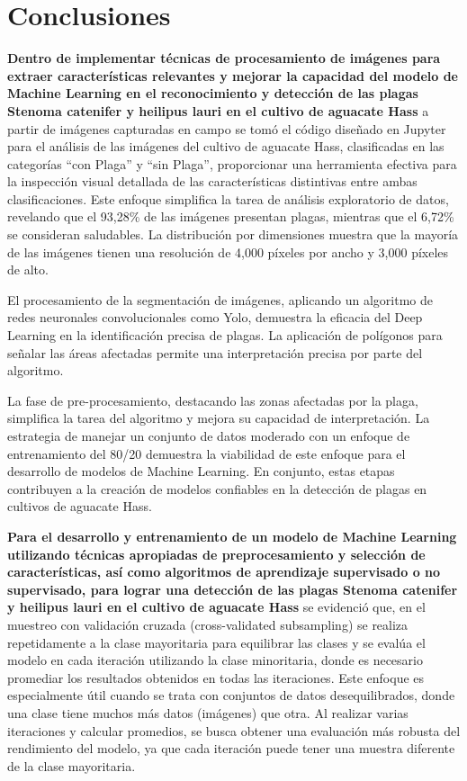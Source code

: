 \section{Conclusiones}

\textbf{Dentro de implementar técnicas de procesamiento de imágenes para extraer características relevantes y mejorar la capacidad del modelo de Machine Learning en el reconocimiento y detección de las plagas Stenoma catenifer y heilipus lauri en el cultivo de aguacate Hass} a partir de imágenes capturadas en campo se tomó el código diseñado en Jupyter para el análisis de las imágenes del cultivo de aguacate Hass, clasificadas en las categorías ``con Plaga'' y ``sin Plaga'', proporcionar una herramienta efectiva para la inspección visual detallada de las características distintivas entre ambas clasificaciones. Este enfoque simplifica la tarea de análisis exploratorio de datos, revelando que el 93,28\% de las imágenes presentan plagas, mientras que el 6,72\% se consideran saludables. La distribución por dimensiones muestra que la mayoría de las imágenes tienen una resolución de 4,000 píxeles por ancho y 3,000 píxeles de alto.

El procesamiento de la segmentación de imágenes, aplicando un algoritmo de redes neuronales convolucionales como Yolo, demuestra la eficacia del Deep Learning en la identificación precisa de plagas. La aplicación de polígonos para señalar las áreas afectadas permite una interpretación precisa por parte del algoritmo.

La fase de pre-procesamiento, destacando las zonas afectadas por la plaga, simplifica la tarea del algoritmo y mejora su capacidad de interpretación. La estrategia de manejar un conjunto de datos moderado con un enfoque de entrenamiento del 80/20 demuestra la viabilidad de este enfoque para el desarrollo de modelos de Machine Learning. En conjunto, estas etapas contribuyen a la creación de modelos confiables en la detección de plagas en cultivos de aguacate Hass.

\newpage

\textbf{Para el desarrollo y entrenamiento de un modelo de Machine Learning utilizando técnicas apropiadas de preprocesamiento y selección de características, así como algoritmos de aprendizaje supervisado o no supervisado, para lograr una detección de las plagas Stenoma catenifer y heilipus lauri en el cultivo de aguacate Hass} se evidenció que, en el muestreo con validación cruzada (cross-validated subsampling) se realiza repetidamente a la clase mayoritaria para equilibrar las clases y se evalúa el modelo en cada iteración utilizando la clase minoritaria, donde es necesario promediar los resultados obtenidos en todas las iteraciones. Este enfoque es especialmente útil cuando se trata con conjuntos de datos desequilibrados, donde una clase tiene muchos más datos (imágenes) que otra. Al realizar varias iteraciones y calcular promedios, se busca obtener una evaluación más robusta del rendimiento del modelo, ya que cada iteración puede tener una muestra diferente de la clase mayoritaria.

